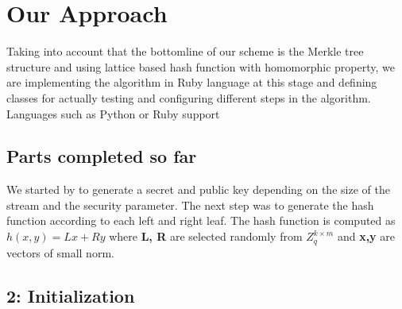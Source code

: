 \documentclass[11pt, letterpaper, oneside]{article}
\begin{document}
\section{Our Approach}

Taking into account that the bottomline of our scheme is the Merkle tree structure and using lattice based hash
function with homomorphic property, we are implementing the algorithm in Ruby language at this stage and 
defining classes for actually testing and configuring different steps in the algorithm. \\

Languages such as Python or Ruby support 

\subsection{ Parts completed so far}


We started by to generate a secret and public key depending on the size of the stream and the 
security parameter. The next step was to generate the hash function according to each left and right leaf. 
The hash function is computed as $ h(x,y) = Lx + Ry $ where \textbf{L, R} are selected randomly from $Z_{q}^{k \times m}$ and
\textbf{x,y} are vectors of small norm.





\subsection{ 2: Initialization}


\end{document}
